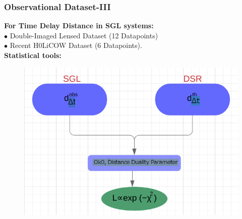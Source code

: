 \documentclass[xcolor=table,bigger]{beamer}
\begin{document}
\begin{frame}
 \frametitle{Observational Dataset-III}
 \textbf{For Time Delay Distance in SGL systems:}\\\hspace{1cm} $\bullet$ Double-Imaged Lensed Dataset (12 Datapoints)\\
\hspace{1cm} $\bullet$ Recent H0LiCOW Dataset (6 Datapoints).
 \vspace{2mm}\\
 \textbf{Statistical tools:}
 \begin{figure}[ht!]
\centering
\includegraphics[width=80 mm]{flowchart_eicp1}
\end{figure} 
 \end{frame}
\end{document}
